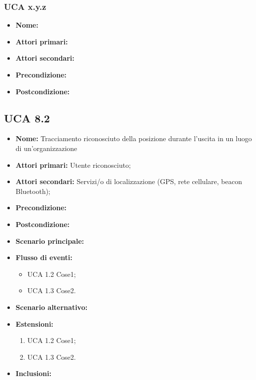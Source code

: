 \subsubsection{UCA x.y.z}%
\begin{itemize}
\item \textbf{Nome:}
\item \textbf{Attori primari:}
\item \textbf{Attori secondari:}%
\item \textbf{Precondizione:}
\item \textbf{Postcondizione:}
\end{itemize}

\subsection{UCA 8.2}%
\begin{itemize}
	\item \textbf{Nome:} Tracciamento riconosciuto della posizione durante l'uscita in un luogo di un'organizzazione
	\item \textbf{Attori primari:} Utente riconosciuto;
	\item \textbf{Attori secondari:} Servizi/o di localizzazione (GPS, rete cellulare, beacon Bluetooth);
	\item \textbf{Precondizione:}
	\item \textbf{Postcondizione:}
	\item \textbf{Scenario principale:}
	\item \textbf{Flusso di eventi:} 
	\begin{itemize}
		\item UCA 1.2 Cose1;
		\item UCA 1.3 Cose2.
	\end{itemize}
	\item \textbf{Scenario alternativo:}
	\item \textbf{Estensioni:}
	\begin{enumerate}
		\item UCA 1.2 Cose1;
		\item UCA 1.3 Cose2.
	\end{enumerate}
	\item \textbf{Inclusioni:}
\end{itemize}

